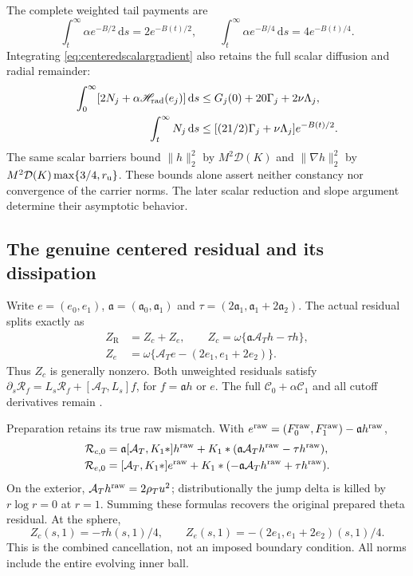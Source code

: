 \documentclass[11pt]{article}
\numberwithin{equation}{section}
\newcommand{\dd}{\,\mathrm d}
\begin{document}
The complete weighted tail payments are
\begin{equation}\label{eq:centeredexponentialtails}
 \int_t^\infty\alpha e^{-B/2}\dd s=2e^{-B(t)/2},\qquad
 \int_t^\infty\alpha e^{-B/4}\dd s=4e^{-B(t)/4}.
\end{equation}
Integrating \eqref{eq:centeredscalargradient} also retains the full
scalar diffusion and radial remainder:
\begin{align*}
 \int_0^\infty[2N_j+\alpha\mathscr H_{\rm rad}(e_j)]\dd s
 &\le G_j(0)+20\Gamma_j+2\nu\Lambda_j,\\
 \int_t^\infty N_j\dd s
 &\le[(21/2)\Gamma_j+\nu\Lambda_j]e^{-B(t)/2}.
\end{align*}
The same scalar barriers bound $\|h\|_2^2$ by $M^2\mathcal D(K)$ and
$\|\nabla h\|_2^2$ by $M^2\mathcal D(K)\max\{3/4,r_{\rm u}\}$.
These bounds alone assert neither constancy nor convergence of the carrier norms.
The later scalar reduction and slope argument determine their asymptotic behavior.

\subsection{The genuine centered residual and its dissipation}

Write $e=(e_0,e_1)$, $\mathfrak a=(\mathfrak a_0,\mathfrak a_1)$ and
$\tau=(2\mathfrak a_1,\mathfrak a_1+2\mathfrak a_2)$. The actual
residual splits exactly as
\begin{equation}\label{eq:commoncarrierresidual}
 \begin{aligned}
 Z_{\mathrm R}&=Z_c+Z_e,\qquad
 Z_c=\omega\{\mathfrak a\mathcal A_Th-\tau h\},\\
 Z_e&=\omega\{\mathcal A_Te-(2e_1,e_1+2e_2)\}.
 \end{aligned}
\end{equation}
Thus $Z_c$ is generally nonzero. Both unweighted residuals satisfy
$\partial_s\mathcal R_f=L_s\mathcal R_f+
[\mathcal A_T,L_s]f$, for $f=\mathfrak ah$ or $e$.
The full $\mathscr C_0+\alpha\mathscr C_1$ and all cutoff derivatives
remain \cite{CenteredProductionNote}.

Preparation retains its true raw mismatch. With
$e^{\rm raw}=(F_0^{\rm raw},F_1^{\rm raw})-\mathfrak ah^{\rm raw}$,
\begin{align}
 \mathcal R_{c,0}&=\mathfrak a[\mathcal A_T,K_1*]h^{\rm raw}
    +K_1*(\mathfrak a\mathcal A_Th^{\rm raw}-\tau h^{\rm raw}),
 \nonumber\\
 \mathcal R_{e,0}&=[\mathcal A_T,K_1*]e^{\rm raw}
    +K_1*(-\mathfrak a\mathcal A_Th^{\rm raw}+\tau h^{\rm raw}).
 \label{eq:centeredpreparationmismatch}
\end{align}
On the exterior, $\mathcal A_Th^{\rm raw}=2\rho_Tu^2$; distributionally
the jump delta is killed by $r\log r=0$ at $r=1$.
Summing these formulas recovers the original prepared theta residual.
At the sphere,
\begin{equation}\label{eq:centeredsphere}
 Z_c(s,1)=-\tau h(s,1)/4,\qquad
 Z_e(s,1)=-(2e_1,e_1+2e_2)(s,1)/4.
\end{equation}
This is the combined cancellation, not an imposed boundary condition.
All norms include the entire evolving inner ball.
\end{document}

